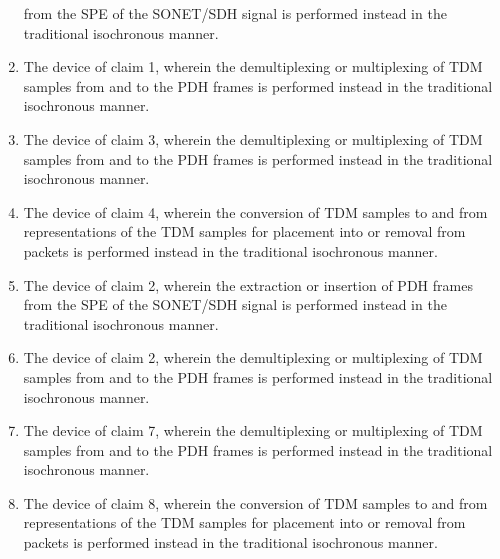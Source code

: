 \documentclass[letterpaper,final,notitlepage,twocolumn,10pt,twoside]{article}
\begin{document}
\begin{enumerate}
from the SPE of the SONET/SDH signal is performed instead in the traditional
isochronous manner.
\item The device of claim 1, wherein the demultiplexing or multiplexing of TDM
samples from and to the PDH frames is performed instead in the traditional
isochronous manner.
\item The device of claim 3, wherein the demultiplexing or multiplexing of TDM
samples from and to the PDH frames is performed instead in the traditional
isochronous manner.
\item The device of claim 4, wherein the conversion of TDM samples to and from
representations of the TDM samples for placement into or removal from packets
is performed instead in the traditional isochronous manner.
\item The device of claim 2, wherein the extraction or insertion of PDH frames
from the SPE of the SONET/SDH signal is performed instead in the traditional
isochronous manner.
\item The device of claim 2, wherein the demultiplexing or multiplexing of TDM
samples from and to the PDH frames is performed instead in the traditional
isochronous manner.
\item The device of claim 7, wherein the demultiplexing or multiplexing of TDM
samples from and to the PDH frames is performed instead in the traditional
isochronous manner.
\item The device of claim 8, wherein the conversion of TDM samples to and from
representations of the TDM samples for placement into or removal from packets
is performed instead in the traditional isochronous manner.
\end{enumerate}

\end{document}
